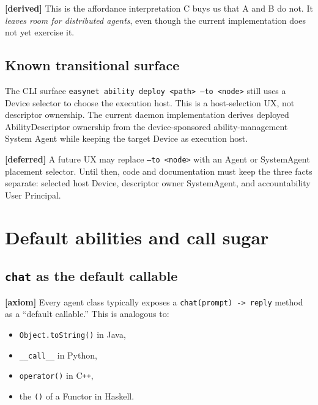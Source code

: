 \documentclass[11pt,a4paper]{article}
\newcommand{\axiom}{\textcolor{axiomcolor}{\textbf{[axiom]}}\xspace}
\newcommand{\derived}{\textcolor{derivedcolor}{\textbf{[derived]}}\xspace}
\newcommand{\deferred}{\textcolor{deferredcolor}{\textbf{[deferred]}}\xspace}
\begin{document}
\derived{} This is the affordance interpretation C buys us that A and B do
not. It \emph{leaves room for distributed agents}, even though the current
implementation does not yet exercise it.

\subsection{Known transitional surface}

\begin{warningbox}
The CLI surface \texttt{easynet ability deploy <path> --to <node>} still uses a
Device selector to choose the execution host. This is a host-selection UX, not
descriptor ownership. The current daemon implementation derives deployed
AbilityDescriptor ownership from the device-sponsored ability-management
System Agent while keeping the target Device as execution host.

\smallskip
\deferred{} A future UX may replace \texttt{--to <node>} with an Agent or
SystemAgent placement selector. Until then, code and documentation must keep the
three facts separate: selected host Device, descriptor owner SystemAgent, and
accountability User Principal.
\end{warningbox}

\section{Default abilities and call sugar}
\label{sec:default-call}

\subsection{\texttt{chat} as the default callable}

\axiom{} Every agent class typically exposes a \texttt{chat(prompt) -> reply}
method as a ``default callable.'' This is analogous to:

\begin{itemize}[leftmargin=2em,itemsep=0.2em]
    \item \texttt{Object.toString()} in Java,
    \item \texttt{\_\_call\_\_} in Python,
    \item \texttt{operator()} in C\texttt{++},
    \item the \texttt{()} of a Functor in Haskell.
\end{itemize}
\end{document}
